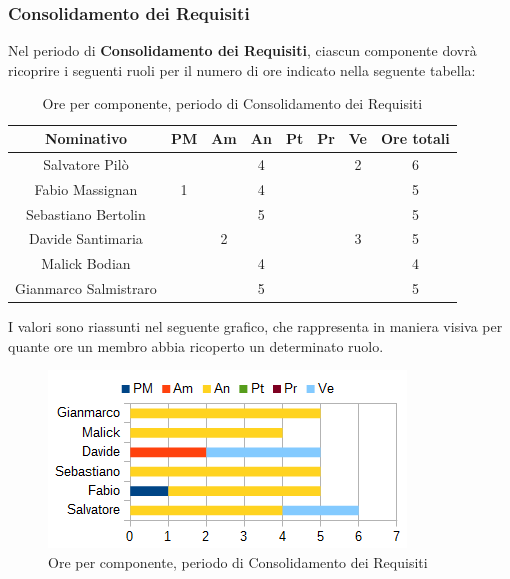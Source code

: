 		\subsubsection{Consolidamento dei Requisiti}
		Nel periodo di \textbf{Consolidamento dei Requisiti}, ciascun componente dovrà ricoprire i seguenti ruoli per il numero di ore indicato nella seguente tabella: \\
		\begin{table}[H]
		\centering
		\begin{tabular}{|c|c|c|c|c|c|c|c|}
			\hline
			\textbf{Nominativo}		& \textbf{PM}	& \textbf{Am}	& \textbf{An}	& \textbf{Pt}	& \textbf{Pr}	& \textbf{Ve}	& \textbf{Ore totali}     \\
			\hline
			Salvatore Pilò			&		& 		& 4		&		&		& 2		& 6 \\
			Fabio Massignan			& 1		& 		& 4		&		&		& 		& 5 \\
			Sebastiano Bertolin		&		& 		& 5		&		&		&		& 5 \\
			Davide Santimaria		&		& 2		&		&		&		& 3		& 5 \\
			Malick Bodian			& 		& 		& 4		&		&		& 		& 4 \\
			Gianmarco Salmistraro	&		& 		& 5		&		&		& 		& 5 \\
			\hline
		\end{tabular}
		\caption{Ore per componente, periodo di Consolidamento dei Requisiti}
		\end{table}
		I valori sono riassunti nel seguente grafico, che rappresenta in maniera visiva per quante ore un membro abbia ricoperto un determinato ruolo. \\
		\begin{figure}[H]
			\centering
			\includegraphics[scale=1]{immagini/grafici/analisi_dettaglio-barra.png}
			\caption{Ore per componente, periodo di Consolidamento dei Requisiti}
		\end{figure}
